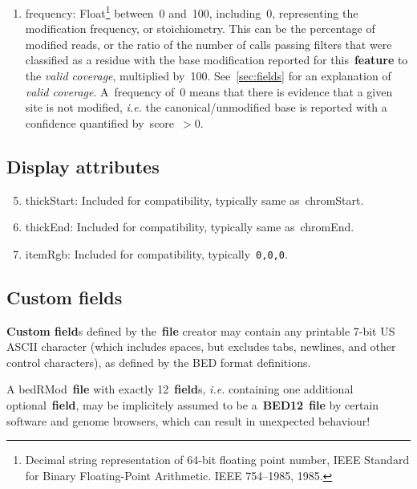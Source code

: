 \documentclass[11pt]{article}
\begin{document}
\begin{enumerate}
\item \textsf{frequency}: Float\footnote{Decimal string representation of 64-bit floating point number, IEEE Standard for Binary Floating-Point Arithmetic. IEEE 754–1985, 1985.} between~0 and~100, including~0, representing the modification frequency, or stoichiometry. This can be the percentage of modified reads, or the ratio of the number of calls passing filters that were classified as a residue with the base modification reported for this~\textbf{feature} to the \emph{valid coverage}, multiplied by~100. See~\autoref{sec:fields} for an explanation of \emph{valid coverage}. A~\textsf{frequency} of~0 means that there is evidence that a given site is not modified, \textit{i.e.} the canonical/unmodified base is reported with a confidence quantified by~\textsf{score}~$>$0.
\end{enumerate}

\subsection{Display attributes}
\begin{enumerate}
  \setcounter{enumi}{4}

\item \textsf{thickStart}: Included for compatibility, typically same as~\textsf{chromStart}.

\item \textsf{thickEnd}: Included for compatibility, typically same as~\textsf{chromEnd}.

\item \textsf{itemRgb}: Included for compatibility, typically~\texttt{0,0,0}.

\end{enumerate}

\subsection{Custom fields}\label{sec:custom_fields}

\textbf{Custom field}s defined by the~\textbf{file} creator may contain any printable 7-bit US \ac{ASCII} character (which includes spaces, but excludes tabs, newlines, and other control characters), as defined by the \ac{BED} format definitions.

A \acs{bedRMod}~\textbf{file} with exactly 12~\textbf{field}s, \textit{i.e.} containing one additional optional~\textbf{field}, may be implicitely 
assumed to be a~\textbf{BED12}~\textbf{file} by certain software and genome browsers, which can result in unexpected behaviour! 
\end{document}
